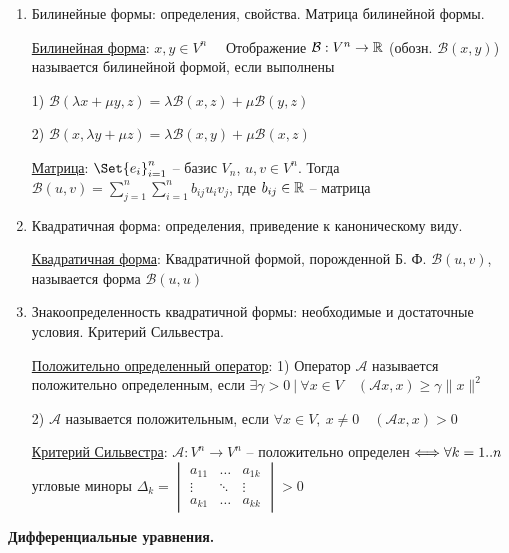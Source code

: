 \documentclass[12pt]{article}
\begin{document}
\begin{enumerate}
        \item Билинейные формы: определения, свойства. Матрица билинейной формы.

        \hyperlink{bilinearforms}{Билинейная форма}: $x, y \in V^n \quad$ Отображение $\mathcal{B}: V^n \to \mathbb{R}$ (обозн. $\mathcal{B}(x, y)$)
        называется билинейной формой, если выполнены

        1) $\mathcal{B}(\lambda x + \mu y, z) = \lambda \mathcal{B}(x, z) + \mu \mathcal{B}(y, z)$

        2) $\mathcal{B}(x, \lambda y + \mu z) = \lambda \mathcal{B}(x, y) + \mu \mathcal{B}(x, z)$

        \hyperlink{bilinearformmatrix}{Матрица}: $\Set{e_i}_{i=1}^n$ -- базис $V_n$, $u, v \in V^n$. Тогда $\mathcal{B}(u, v) =
        \sum_{j = 1}^{n}\sum_{i = 1}^{n} b_{ij} u_i v_j$, где $b_{ij} \in \mathbb{R}$ -- матрица


        \item Квадратичная форма: определения, приведение к каноническому виду.

        \hyperlink{quadraticform}{Квадратичная форма}: Квадратичной формой, порожденной Б. Ф. $\mathcal{B}(u, v)$, называется форма $\mathcal{B}(u, u)$


        \item Знакоопределенность квадратичной формы: необходимые и достаточные условия. Критерий Сильвестра.

        \hyperlink{positivedefinedoperator}{Положительно определенный оператор}: 1) Оператор $\mathcal{A}$ называется положительно определенным, если
        $\exists \gamma > 0 \ | \ \forall x \in V \quad (\mathcal{A}x, x) \geq \gamma \|x\|^2$

        2) $\mathcal{A}$ называется положительным, если
        $\forall x \in V, \ x \neq 0 \quad (\mathcal{A}x, x) > 0$


        \hyperlink{criterionSilvester}{Критерий Сильвестра}: $\mathcal{A}: V^n \to V^n$ -- положительно определен $\Longleftrightarrow \\ \forall k = 1..n $ угловые миноры $ \Delta_k =
        \begin{vmatrix}a_{11} & \dots & a_{1k} \\ \vdots & \ddots & \vdots \\ a_{k1} & \dots & a_{kk}\end{vmatrix} > 0$


    \end{enumerate}

    \begin{center}
        \textbf{Дифференциальные уравнения.}
    \end{center}
\end{document}
